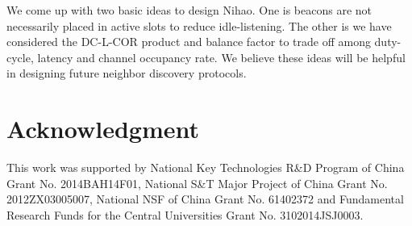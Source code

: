 \documentclass[conference]{IEEEtran}
\begin{document}
We come up with two basic ideas to design Nihao.
One is beacons are not necessarily placed in active slots to reduce idle-listening.
The other is we have considered the DC-L-COR product and balance factor to trade off among duty-cycle, latency and channel occupancy rate.
We believe these ideas will be helpful in designing future neighbor discovery protocols.


\section*{Acknowledgment}
This work was supported by National Key Technologies R\&D Program of China Grant No. 2014BAH14F01,
National S\&T Major Project of China Grant No. 2012ZX03005007, National NSF of China Grant No. 61402372 and Fundamental Research Funds for the Central Universities Grant No. 3102014JSJ0003.




\end{document}

